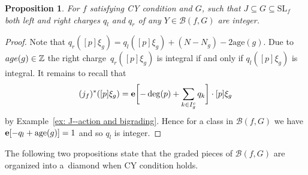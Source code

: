 \documentclass[10pt,a4paper]{article}
\numberwithin{equation}{section}
\newtheorem{Proposition}[Theorem]{Proposition}
 { \theoremstyle{definition}
\newtheorem{Definition}[Theorem]{Definition}
\newtheorem{Note}[Theorem]{Note}
\newtheorem{Example}[Theorem]{Example}
\newtheorem{Remark}[Theorem]{Remark} }
\newcommand{\ZZ}{{\mathbb{Z}}}
\newcommand{\SL}{{\mathrm{SL}}}
\newcommand{\epi}{{\bf e}}
\newcommand{\age}{\mathrm{age}}
\def\B{{\mathcal B}}
\begin{document}
\begin{Proposition}
	For $f$ satisfying CY condition and $G$, such that $J \subseteq G \subseteq \SL_f$ both left and right charges $q_l$ and $q_r$ of any $Y \in \B(f,G)$ are integer.
\end{Proposition}
\begin{proof}
	Note that $q_r([p]\xi_g) = q_l([p]\xi_g) + (N-N_g) - 2 \age(g)$. Due to ${\rm age}(g)\in\ZZ$ the right charge~$q_r([p]\xi_g)$ is integral if and only if $q_l([p]\xi_g)$ is integral.
 It remains to recall that
 \[
 (j_f)^*([p]\xi_g)=\epi\biggl[-\deg(p) + \sum_{k \in I_g^c} q_k\biggr]\cdot [p]\xi_g
 \]
 by Example~\ref{ex: J--action and bigrading}. Hence for a class in $\B(f,G)$ we have $\epi[-q_l+\age(g)]=1$ and so $q_l$ is integer.
\end{proof}

The following two propositions state that the graded pieces of $\B(f,G)$ are organized into a~diamond when CY condition holds.
\end{document}
